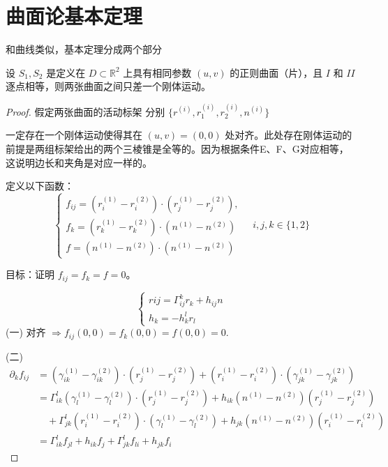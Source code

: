 \documentclass[lang=cn,10pt,thmcnt=section]{elegantbook}
\begin{document}
\section{曲面论基本定理}
和曲线类似，基本定理分成两个部分
\begin{theorem}[唯一性定理]
    设 \( S_1, S_2 \) 是定义在 \( D \subset \mathbb{R}^2 \) 上具有相同参数 \( (u, v) \) 的正则曲面（片），且 \( I \) 和 \( II \) 逐点相等，则两张曲面之间只差一个刚体运动。
\end{theorem}
\begin{proof}
    假定两张曲面的活动标架
分别 $\{r^{(i)}, r_1^{(i)}, r_2^{(i)}, n^{(i)}\}$

一定存在一个刚体运动使得其在 $(u,v) = (0,0)$ 处对齐。此处存在刚体运动的前提是两组标架给出的两个三棱锥是全等的。因为根据条件E、F、G对应相等，这说明边长和夹角是对应一样的。

定义以下函数：
\[
\begin{cases}
f_{ij} = (r_i^{(1)} - r_i^{(2)}) \cdot (r_j^{(1)} - r_j^{(2)}), \\
f_k = (r_k^{(1)} - r_k^{(2)}) \cdot (n^{(1)} - n^{(2)}) \\
f = (n^{(1)} - n^{(2)}) \cdot (n^{(1)} - n^{(2)})
\end{cases}
\quad i,j,k \in \{1,2\}
\]


目标：证明 $f_{ij} = f_k = f = 0$。

\[
\begin{cases}
r{ij} = \Gamma_{ij}^k r_k + h_{ij} n \\
h_k = -h^l_k r_l
\end{cases}
\]
(一) 对齐 $\Rightarrow f_{ij}(0,0) = f_k(0,0) = f(0,0) = 0$.


(二) 
\begin{align*}
\partial_k f_{ij} &= \left( \gamma_{ik}^{(1)} - \gamma_{ik}^{(2)} \right) \cdot \left( r_j^{(1)} - r_j^{(2)} \right) + \left( r_i^{(1)} - r_i^{(2)} \right) \cdot \left( \gamma_{jk}^{(1)} - \gamma_{jk}^{(2)} \right) \\
&= \Gamma_{ik}^l \left( \gamma_l^{(1)} - \gamma_l^{(2)} \right) \cdot \left( r_j^{(1)} - r_j^{(2)} \right) + h_{ik} \left( n^{(1)} - n^{(2)} \right) \left( r_j^{(1)} - r_j^{(2)} \right) \\
&\quad + \Gamma_{jk}^l \left( r_i^{(1)} - r_i^{(2)} \right) \cdot \left( \gamma_l^{(1)} - \gamma_l^{(2)} \right) + h_{jk} \left( n^{(1)} - n^{(2)} \right) \left( r_i^{(1)} - r_i^{(2)} \right) \\
&= \Gamma_{ik}^l f_{jl} + h_{ik} f_j + \Gamma_{jk}^l f_{li} + h_{jk} f_i
\end{align*}


\end{proof}
\end{document}
